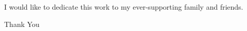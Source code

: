 \begin{dedication}
  I would like to dedicate this work to my ever-supporting family and friends.
  \\[2em]
  \centerline{Thank You}
\end{dedication}
